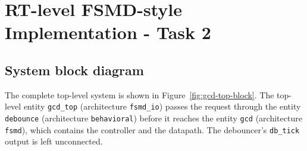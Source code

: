 \section{RT-level FSMD-style Implementation - Task 2}

\subsection{System block diagram}

The complete top-level system is shown in Figure~\ref{fig:gcd-top-block}.
The top-level entity \texttt{gcd\_top} (architecture \texttt{fsmd\_io}) passes the request through the entity \texttt{debounce} (architecture \texttt{behavioral}) before it reaches the entity \texttt{gcd} (architecture \texttt{fsmd}), which contains the controller and the datapath. The debouncer's \texttt{db\_tick} output is left unconnected.


